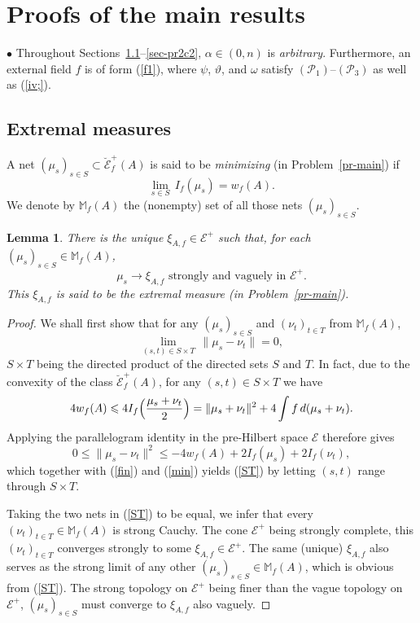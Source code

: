 \documentclass[12pt,a4paper,reqno]{amsart} %
\theoremstyle{lause}
\theoremstyle{maaritelma}
\theoremstyle{lause}
\newtheorem{lemma}[theorem]{Lemma}
\theoremstyle{maaritelma}
\numberwithin{equation}{section}
\begin{document}
\section{Proofs of the main results}\label{sec-proofs}

$\bullet$ Throughout Sections~\ref{sec-lemmas}--\ref{sec-pr2c2}, $\alpha\in(0,n)$ is {\it arbitrary}. Furthermore, an external field $f$ is of form (\ref{f1}), where $\psi$, $\vartheta$, and $\omega$ satisfy $(\mathcal P_1)$--$(\mathcal P_3)$ as well as (\ref{iv;}).

\subsection{Extremal measures}\label{sec-lemmas} A net $(\mu_s)_{s\in S}\subset\breve{\mathcal E}^+_f(A)$ is said to be {\it minimizing} (in Problem~\ref{pr-main}) if
\begin{equation}\label{min}
\lim_{s\in S}\,I_f(\mu_s)=w_f(A).
\end{equation}
We denote by $\mathbb M_f(A)$ the (nonempty) set of all those nets $(\mu_s)_{s\in S}$.

\begin{lemma}\label{la1}
  There is the unique $\xi_{A,f}\in\mathcal E^+$ such that, for each $(\mu_s)_{s\in S}\in\mathbb M_f(A)$,
  \begin{equation}\label{conv}
    \mu_s\to\xi_{A,f}\text{ \ strongly and vaguely in $\mathcal E^+$}.
  \end{equation}
This $\xi_{A,f}$ is said to be the extremal measure {\rm(}in Problem~{\rm\ref{pr-main}}{\rm)}.
\end{lemma}

\begin{proof} We shall first show that for any $(\mu_s)_{s\in S}$ and $(\nu_t)_{t\in T}$
from $\mathbb M_f(A)$,
\begin{equation}\label{ST}
\lim_{(s,t)\in S\times T}\,\|\mu_s-\nu_t\|=0,
\end{equation}
$S\times T$ being the directed product of the directed sets $S$ and
$T$. In fact, due to the convexity of the class $\breve{\mathcal E}^+_f(A)$, for any $(s,t)\in S\times T$ we have
\[4w_f(A)\leqslant4I_f\Bigl(\frac{\mu_s+\nu_t}{2}\Bigr)=\|\mu_s+\nu_t\|^2+4\int f\,d(\mu_s+\nu_t).\]
Applying the parallelogram identity in the pre-Hilbert space $\mathcal E$ therefore gives
\[0\leqslant\|\mu_s-\nu_t\|^2\leqslant-4w_f(A)+2I_f(\mu_s)+2I_f(\nu_t),\]
which together with (\ref{fin}) and (\ref{min}) yields (\ref{ST}) by letting $(s,t)$ range through $S\times T$.

Taking the two nets in (\ref{ST}) to be equal, we infer that every $(\nu_t)_{t\in T}\in\mathbb M_f(A)$ is strong Cauchy. The cone $\mathcal E^+$ being strongly complete, this $(\nu_t)_{t\in T}$ converges strongly to some $\xi_{A,f}\in\mathcal E^+$. The same (unique) $\xi_{A,f}$ also serves as the strong limit of any other $(\mu_s)_{s\in S}\in\mathbb M_f(A)$, which is obvious from (\ref{ST}). The strong topology on $\mathcal E^+$ being finer than the vague topology on $\mathcal E^+$, $(\mu_s)_{s\in S}$ must converge to $\xi_{A,f}$ also vaguely.
\end{proof}
\end{document}
